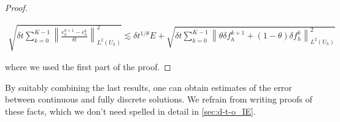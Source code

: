 \documentclass[english,a4paper,9pt,oneside]{scrbook}	%
\theoremstyle{break}
\newenvironment{mproof}[1][\proofname]{%
  \begin{proof}[#1]$ $\par\nobreak\ignorespaces
}{%
  \end{proof}
}
\renewcommand*{\proofname}{Proof}
\theoremstyle{remark}
\newcommand{\norm}[1]{\left\lVert#1\right\rVert}
\newcommand{\te}{\theta}
\begin{document}
\begin{appendices}
\begin{mproof}
%

\begin{align*}
\sqrt{\delta t \sum_{k=0}^{K-1} \norm{\frac{e_{h}^{k+1}-e_h^k}{\delta t}}_{L^2(U_h)}^2}  \lesssim \delta t^{1/\te} E + \sqrt{\delta t \sum_{k=0}^{K-1}\norm{\theta \delta f_h^{k+1}+(1-\theta)\delta f_h^k}_{L^2(U_h)}^2}
\end{align*}

where we used the first part of the proof.
%
%
%
%
%
%
\end{mproof}

By suitably combining the last results, one can obtain estimates of the error between continuous and fully discrete solutions. We refrain from writing proofs of these facts, which we don't need spelled in detail in \cref{sec:d-t-o_IE}.

\end{appendices}

\newpage


\printbibliography[title={Bibliography}]

\end{document}
